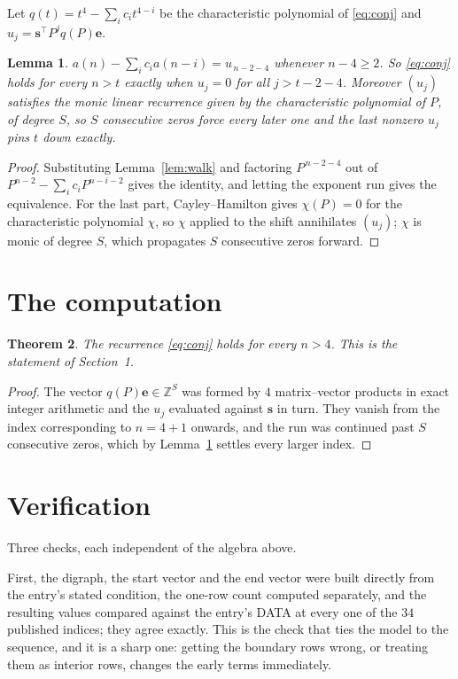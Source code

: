 \documentclass[11pt,a4paper]{article}
\theoremstyle{plain}
\newtheorem{theorem}{Theorem}
\newtheorem{lemma}[theorem]{Lemma}
\theoremstyle{definition}
\begin{document}
Let $q(t)=t^{4}-\sum_i c_i t^{4-i}$ be the characteristic polynomial of
\eqref{eq:conj} and $u_j=\mathbf{s}^{\!\top}P^{j}q(P)\mathbf{e}$.

\begin{lemma}\label{lem:crit}
$a(n)-\sum_i c_i a(n-i)=u_{\,n-2-4}$ whenever $n-4\ge2$. So \eqref{eq:conj}
holds for every $n>t$ exactly when $u_j=0$ for all $j>t-2-4$. Moreover $(u_j)$
satisfies the monic linear recurrence given by the characteristic polynomial of $P$, of
degree $S$, so $S$ consecutive zeros force every later one and the last nonzero $u_j$ pins
$t$ down exactly.
\end{lemma}

\begin{proof}
Substituting Lemma~\ref{lem:walk} and factoring $P^{\,n-2-4}$ out of
$P^{n-2}-\sum_i c_i P^{n-i-2}$ gives the identity, and letting the exponent run gives the
equivalence. For the last part, Cayley--Hamilton gives $\chi(P)=0$ for the characteristic
polynomial $\chi$, so $\chi$ applied to the shift annihilates $(u_j)$; $\chi$ is monic of
degree $S$, which propagates $S$ consecutive zeros forward.
\end{proof}

\section{The computation}

\begin{theorem}
The recurrence \eqref{eq:conj} holds for every $n>4$. This is the statement of
Section~1.
\end{theorem}

\begin{proof}
The vector $q(P)\mathbf{e}\in\mathbb{Z}^{S}$ was formed by $4$ matrix--vector
products in exact integer arithmetic and the $u_j$ evaluated against $\mathbf{s}$ in turn.
They vanish from the index corresponding to $n=4+1$ onwards, and the run was continued
past $S$ consecutive zeros, which by Lemma~\ref{lem:crit} settles every larger index.
\end{proof}

\section{Verification}

Three checks, each independent of the algebra above.

First, the digraph, the start vector and the end vector were built directly from the
entry's stated condition, the one-row count computed separately, and the resulting values
compared against the entry's DATA at every one of the $34$ published indices; they
agree exactly. This is the check that ties the model to the sequence, and it is a sharp one:
getting the boundary rows wrong, or treating them as interior rows, changes the early terms
immediately.
\end{document}
